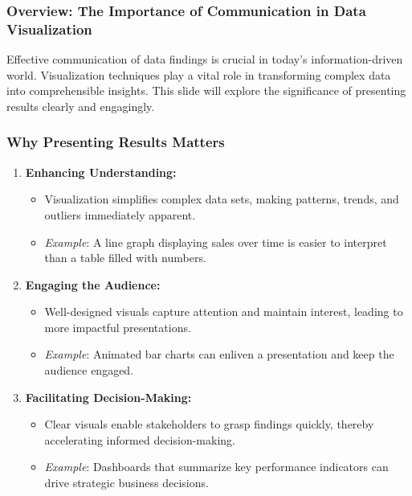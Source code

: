\documentclass[aspectratio=169]{beamer}
\begin{document}
\frame{\titlepage}

\begin{frame}
    \titlepage
\end{frame}

\begin{frame}
    \frametitle{Overview: The Importance of Communication in Data Visualization}
    Effective communication of data findings is crucial in today’s information-driven world. 
    Visualization techniques play a vital role in transforming complex data into comprehensible insights. 
    This slide will explore the significance of presenting results clearly and engagingly.
\end{frame}

\begin{frame}
    \frametitle{Why Presenting Results Matters}
    \begin{enumerate}
        \item \textbf{Enhancing Understanding:}
        \begin{itemize}
            \item Visualization simplifies complex data sets, making patterns, trends, and outliers immediately apparent.
            \item \textit{Example}: A line graph displaying sales over time is easier to interpret than a table filled with numbers.
        \end{itemize}

        \item \textbf{Engaging the Audience:}
        \begin{itemize}
            \item Well-designed visuals capture attention and maintain interest, leading to more impactful presentations.
            \item \textit{Example}: Animated bar charts can enliven a presentation and keep the audience engaged.
        \end{itemize}

        \item \textbf{Facilitating Decision-Making:}
        \begin{itemize}
            \item Clear visuals enable stakeholders to grasp findings quickly, thereby accelerating informed decision-making.
            \item \textit{Example}: Dashboards that summarize key performance indicators can drive strategic business decisions.
        \end{itemize}
    \end{enumerate}
\end{frame}
\end{document}
